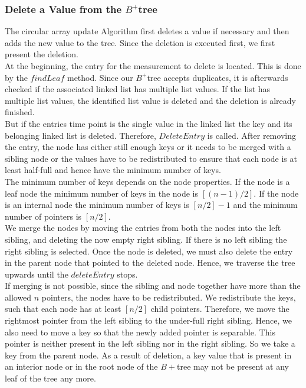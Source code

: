 \documentclass[abstracton,12pt]{scrreprt}
\begin{document}
\subsubsection{Delete a Value from the $B^+$tree}
\label{delete}
The circular array update Algorithm first deletes a value if necessary and then adds the new value to the tree. Since the deletion is executed first, we first present the deletion. \\
At the beginning, the entry for the measurement to delete is located. This is done by the $findLeaf$ method. 
Since our $B^+$tree accepts duplicates, it is afterwards checked if the associated linked list has multiple list values. If the list has multiple list values, the identified list value is deleted and the deletion is already finished. \\
But if the entries time point is the single value in the linked list the key and its belonging linked list is deleted. Therefore, $DeleteEntry$ is called. After removing the entry, the node has either still enough keys or it needs to be merged with a sibling node or the values have to be redistributed to ensure that each node is at least half-full and hence have the minimum number of keys.\\
The minimum number of keys depends on the node properties. If the node is a leaf node the minimum number of keys in the node is $[(n-1)/2]$. If the node is an internal node the minimum number of keys is $[n/2]-1$ and the minimum number of pointers is $[n/2]$. \\
We merge the nodes by moving the entries from both the nodes into the left sibling, and deleting the
now empty right sibling. If there is no left sibling the right sibling is selected. Once the node is deleted, we must also delete the entry in the parent node that pointed to the deleted node. Hence, we traverse the tree upwards until the $deleteEntry$ stops.\\
If merging is not possible, since the sibling and node together have more than the allowed $n$ pointers, the nodes have to be redistributed. We redistribute the keys, such that each node has at least $[n/2]$ child pointers. Therefore, we move the rightmost pointer from the left sibling to the under-full right sibling. Hence, we also need to move a key so that the newly added pointer is separable. This pointer is neither present in the left sibling nor in the right sibling. So we take a key from the parent node.
As a result of deletion, a key value that is present in an interior node or in the root node of the $B+$tree may not be present at any leaf of the tree any more. 
\end{document}
